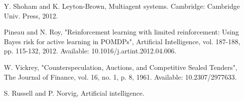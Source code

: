 	\addtolength{\oddsidemargin}{-.875in}
	\addtolength{\evensidemargin}{-.875in}
	\addtolength{\textwidth}{1.75in}

	\addtolength{\topmargin}{-.875in}
	\addtolength{\textheight}{1.75in}


\begin{thebibliography}{9}

Y. Shoham and K. Leyton-Brown, Multiagent systems. Cambridge: Cambridge Univ. Press, 2012.

Pineau and N. Roy, "Reinforcement learning with limited reinforcement: Using Bayes risk for active learning in POMDPs", Artificial Intelligence, vol. 187-188, pp. 115-132, 2012. Available: 10.1016/j.artint.2012.04.006.

W. Vickrey, "Counterspeculation, Auctions, and Competitive Sealed Tenders", The Journal of Finance, vol. 16, no. 1, p. 8, 1961. Available: 10.2307/2977633.

S. Russell and P. Norvig, Artificial intelligence.

\end{thebibliography}


